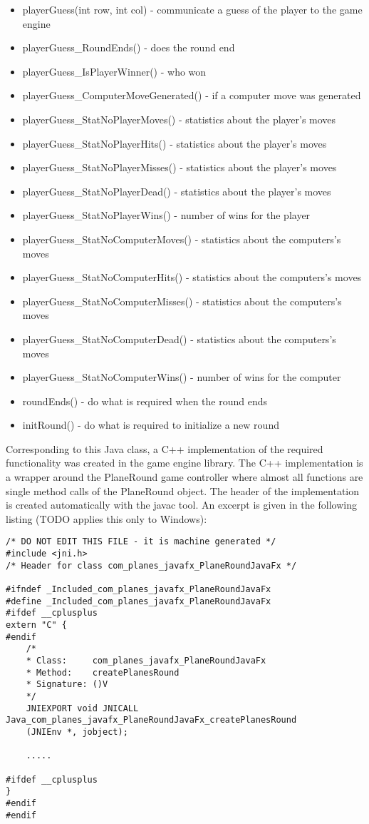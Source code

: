 \begin{itemize}
	\item playerGuess(int row, int col) - communicate a guess of the player to the game engine
	\item playerGuess\_RoundEnds() - does the round end
	\item playerGuess\_IsPlayerWinner() - who won
	\item playerGuess\_ComputerMoveGenerated() - if a computer move was generated
	\item playerGuess\_StatNoPlayerMoves() - statistics about the player's moves
	\item playerGuess\_StatNoPlayerHits() - statistics about the player's moves
	\item playerGuess\_StatNoPlayerMisses() - statistics about the player's moves
	\item playerGuess\_StatNoPlayerDead() - statistics about the player's moves
	\item playerGuess\_StatNoPlayerWins() - number of wins for the player
	\item playerGuess\_StatNoComputerMoves() - statistics about the computers's moves
	\item playerGuess\_StatNoComputerHits() - statistics about the computers's moves
	\item playerGuess\_StatNoComputerMisses() - statistics about the computers's moves
	\item playerGuess\_StatNoComputerDead() - statistics about the computers's moves
	\item playerGuess\_StatNoComputerWins() - number of wins for the computer
	
	\item roundEnds() - do what is required when the round ends
	\item initRound() - do what is required to initialize a new round

\end{itemize}

Corresponding to this Java class, a C++ implementation of the required functionality was created in the game engine library. The C++ implementation is a wrapper around the PlaneRound game controller where almost all functions are single method calls of the PlaneRound object. The header of the implementation is created automatically with the javac tool. An excerpt is given in the following listing (TODO applies this only to Windows):

\begin{lstlisting} 
/* DO NOT EDIT THIS FILE - it is machine generated */
#include <jni.h>
/* Header for class com_planes_javafx_PlaneRoundJavaFx */

#ifndef _Included_com_planes_javafx_PlaneRoundJavaFx
#define _Included_com_planes_javafx_PlaneRoundJavaFx
#ifdef __cplusplus
extern "C" {
#endif
	/*
	* Class:     com_planes_javafx_PlaneRoundJavaFx
	* Method:    createPlanesRound
	* Signature: ()V
	*/
	JNIEXPORT void JNICALL Java_com_planes_javafx_PlaneRoundJavaFx_createPlanesRound
	(JNIEnv *, jobject);
	
	.....

#ifdef __cplusplus
}
#endif
#endif

\end{lstlisting}


